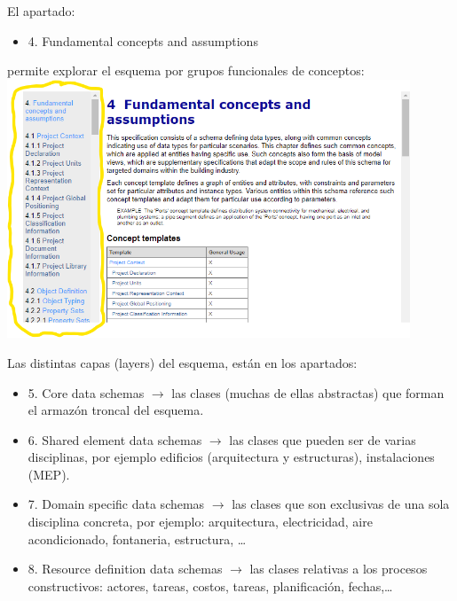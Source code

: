 \documentclass[spanish,10pt,a4paper,final,oneside]{article}
\begin{document}
\vspace{0.5cm}
El apartado:
\begin{itemize}
\item 4. Fundamental concepts and assumptions
\end{itemize}
permite explorar el esquema por grupos funcionales de conceptos:
\\ \includegraphics[width=0.9\textwidth]{IFC4 - apartado 4 - Fundamental concepts and assumptions}

\vspace{0.5cm}
Las distintas capas (layers) del esquema, están en los apartados:
\begin{itemize}
\item 5. Core data schemas $\rightarrow$ las clases (muchas de ellas abstractas) que forman el armazón troncal del esquema.
\item 6. Shared element data schemas $\rightarrow$ las clases que pueden ser de varias disciplinas, por ejemplo  edificios (arquitectura y estructuras), instalaciones (MEP).
\item 7. Domain specific data schemas $\rightarrow$ las clases que son exclusivas de una sola disciplina concreta, por ejemplo: arquitectura, electricidad, aire acondicionado, fontaneria, estructura, \ldots
\item 8. Resource definition data schemas $\rightarrow$ las clases relativas a los procesos constructivos: actores, tareas, costos, tareas, planificación, fechas,\ldots 
\end{itemize}
\end{document}

